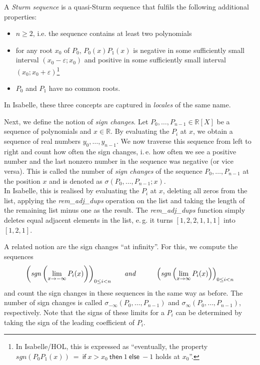 \documentclass[11pt,a4paper,oneside]{article}
\newcommand{\RR}{\mathbb{R}}
\renewcommand{\epsilon}{\varepsilon}
\newcommand{\sgn}{\mathit{sgn}}
\newcommand{\ie}{i.\,e.\xspace}
\newcommand{\eg}{e.\,g.\xspace}
\newcommand{\isabellehol}{\mbox{Isabelle}\slash HOL\xspace}
\begin{document}
A \emph{Sturm sequence} is a quasi-Sturm sequence that fulfils the following additional properties:
\begin{itemize}
\item $n \geq 2$, i.e. the sequence contains at least two polynomials
\item for any root $x_0$ of $P_0$, $P_0(x)P_1(x)$ is negative in some sufficiently small interval $(x_0-\epsilon;x_0)$ and positive in some sufficiently small interval $(x_0;x_0+\epsilon)$\footnote{
In \isabellehol, this is expressed as \enquote{eventually, the property $\sgn(P_0P_1(x))\ =\ \mathsf{if}\ x>x_0\ \mathsf{then}\ 1\ \mathsf{else}\ -1$ holds at $x_0$}.}
\item $P_0$ and $P_1$ have no common roots.
\end{itemize}

In Isabelle, these three concepts are captured in \emph{locales} of the same name.
\vskip5mm

Next, we define the notion of \emph{sign changes}. Let $P_0,\ldots,P_{n-1}\in\RR[X]$ be a sequence of polynomials and $x\in\RR$. By evaluating the $P_i$ at $x$, we obtain a sequence of real numbers $y_0,\ldots,y_{n-1}$. We now traverse this sequence from left to right and count how often the sign changes, \ie how often we see a positive number and the last nonzero number in the sequence was negative (or vice versa). This is called the number of \emph{sign changes} of the sequence $P_0,\ldots,P_{n-1}$ at the position $x$ and is denoted as $\sigma(P_0,\ldots,P_{n-1}; x)$.\\
In Isabelle, this is realised by evaluating the $P_i$ at $x$, deleting all zeros from the list, applying the \emph{rem\_adj\_dups} operation on the list and taking the length of the remaining list minus one as the result. The \emph{rem\_adj\_dups} function simply deletes equal adjacent elements in the list, \eg it turns $[1,2,2,1,1,1]$ into $[1,2,1]$.

A related notion are the sign changes \enquote{at infinity}. For this, we compute the sequences
$$\left(\sgn\left(\lim\limits_{x\to -\infty} P_i(x)\right)\right)_{0\leq i < n}\hskip6mm\textit{and}\hskip10mm
\left(\sgn\left(\lim\limits_{x\to \infty} P_i(x)\right)\right)_{0\leq i < n}$$
and count the sign changes in these sequences in the same way as before. The number of sign changes is called $\sigma_{-\infty}(P_0,\ldots,P_{n-1})$ and $\sigma_{\infty}(P_0,\ldots,P_{n-1})$, respectively. Note that the signs of these limits for a $P_i$ can be determined by taking the sign of the leading coefficient of $P_i$.
\end{document}
